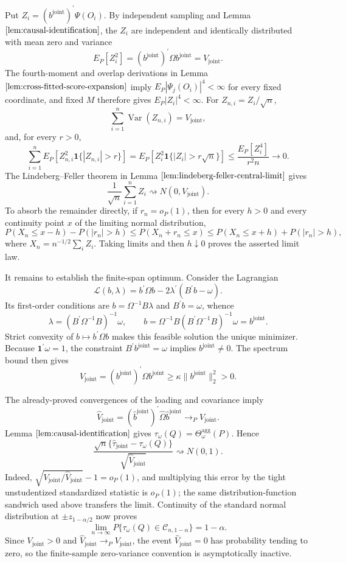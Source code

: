 Put \(Z_i=(b^{\mathrm{joint}})^{\prime}\Psi(O_i)\). By independent sampling and Lemma \(\ref{lem:causal-identification}\), the \(Z_i\) are independent and identically distributed with mean zero and variance
\[
E_P[Z_i^2]=(b^{\mathrm{joint}})^{\prime}\Omega b^{\mathrm{joint}}=V_{\mathrm{joint}}.
\]
The fourth-moment and overlap derivations in Lemma \(\ref{lem:cross-fitted-score-expansion}\) imply \(E_P|\Psi_j(O_i)|^4<\infty\) for every fixed coordinate, and fixed \(M\) therefore gives \(E_P|Z_i|^4<\infty\). For \(Z_{n,i}=Z_i/\sqrt n\),
\[
\sum_{i=1}^n\operatorname{Var}(Z_{n,i})=V_{\mathrm{joint}},
\]
and, for every \(r>0\),
\[
\sum_{i=1}^nE_P[Z_{n,i}^2\mathbf 1\{|Z_{n,i}|>r\}]
=E_P[Z_i^2\mathbf 1\{|Z_i|>r\sqrt n\}]
\le\frac{E_P[Z_i^4]}{r^2n}\longrightarrow0.
\]
The Lindeberg--Feller theorem in Lemma \(\ref{lem:lindeberg-feller-central-limit}\) gives
\[
\frac1{\sqrt n}\sum_{i=1}^nZ_i\rightsquigarrow N(0,V_{\mathrm{joint}}).
\]
To absorb the remainder directly, if \(r_n=o_P(1)\), then for every \(h>0\) and every continuity point \(x\) of the limiting normal distribution,
\[
P(X_n\le x-h)-P(|r_n|>h)
\le P(X_n+r_n\le x)
\le P(X_n\le x+h)+P(|r_n|>h),
\]
where \(X_n=n^{-1/2}\sum_iZ_i\). Taking limits and then \(h\downarrow0\) proves the asserted limit law.

It remains to establish the finite-span optimum. Consider the Lagrangian
\[
\mathcal L(b,\lambda)=b^{\prime}\Omega b
-2\lambda^{\prime}(B^{\prime}b-\omega).
\]
Its first-order conditions are \(b=\Omega^{-1}B\lambda\) and \(B^{\prime}b=\omega\), whence
\[
\lambda=(B^{\prime}\Omega^{-1}B)^{-1}\omega,
\qquad
b=\Omega^{-1}B(B^{\prime}\Omega^{-1}B)^{-1}\omega
=b^{\mathrm{joint}}.
\]
Strict convexity of \(b\mapsto b^{\prime}\Omega b\) makes this feasible solution the unique minimizer. Because \(\mathbf 1^{\prime}\omega=1\), the constraint \(B^{\prime}b^{\mathrm{joint}}=\omega\) implies \(b^{\mathrm{joint}}\ne0\). The spectrum bound then gives
\[
V_{\mathrm{joint}}
=(b^{\mathrm{joint}})^{\prime}\Omega b^{\mathrm{joint}}
\ge\kappa\|b^{\mathrm{joint}}\|_2^2>0.
\]

The already-proved convergences of the loading and covariance imply
\[
\widehat V_{\mathrm{joint}}
=(\widehat b^{\mathrm{joint}})^{\prime}
 \widehat\Omega\widehat b^{\mathrm{joint}}
\to_PV_{\mathrm{joint}}.
\]
Lemma \(\ref{lem:causal-identification}\) gives \(\tau_\omega(Q)=\Theta_\omega^{\mathrm{agg}}(P)\). Hence
\[
\frac{\sqrt n\{\widehat\tau_{\mathrm{joint}}-\tau_\omega(Q)\}}
     {\sqrt{\widehat V_{\mathrm{joint}}}}
\rightsquigarrow N(0,1).
\]
Indeed, \(\sqrt{V_{\mathrm{joint}}/\widehat V_{\mathrm{joint}}}-1=o_P(1)\), and multiplying this error by the tight unstudentized standardized statistic is \(o_P(1)\); the same distribution-function sandwich used above transfers the limit. Continuity of the standard normal distribution at \(\pm z_{1-\alpha/2}\) now proves
\[
\lim_{n\to\infty}P\{\tau_\omega(Q)\in\mathcal C_{n,1-\alpha}\}=1-\alpha.
\]
Since \(V_{\mathrm{joint}}>0\) and \(\widehat V_{\mathrm{joint}}\to_PV_{\mathrm{joint}}\), the event \(\widehat V_{\mathrm{joint}}=0\) has probability tending to zero, so the finite-sample zero-variance convention is asymptotically inactive.

